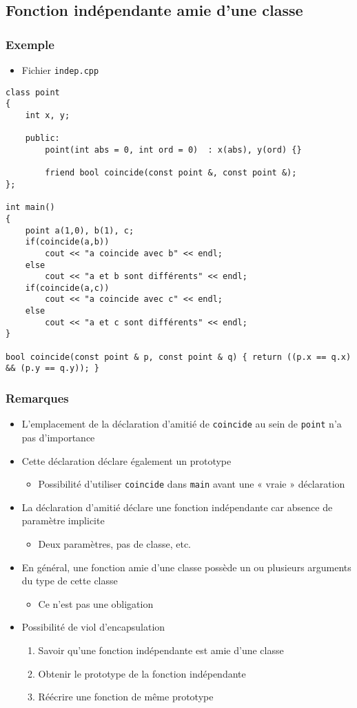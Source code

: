 \subsection{Fonction indépendante amie d'une classe}

\begin{frame}[containsverbatim]
\frametitle{Exemple}
\begin{itemize}
\item Fichier \texttt{indep.cpp}
\end{itemize}
\begin{lstlisting}
class point
{
	int x, y;
	
	public:
		point(int abs = 0, int ord = 0)  : x(abs), y(ord) {}
		
		friend bool coincide(const point &, const point &);
};

int main()
{
	point a(1,0), b(1), c;
	if(coincide(a,b))
		cout << "a coincide avec b" << endl;
	else
		cout << "a et b sont différents" << endl;		
	if(coincide(a,c))
		cout << "a coincide avec c" << endl;
	else
		cout << "a et c sont différents" << endl;
}

bool coincide(const point & p, const point & q) { return ((p.x == q.x) && (p.y == q.y)); }
\end{lstlisting}
\end{frame}

\begin{frame}
\frametitle{Remarques}
\begin{itemize}[<+->]
\item L'emplacement de la déclaration d'amitié de \texttt{coincide} au sein de \texttt{point} n'a pas d'importance
\item Cette déclaration déclare également un prototype
	\begin{itemize}
	\item Possibilité d'utiliser \texttt{coincide} dans \texttt{main} avant une « vraie » déclaration
	\end{itemize}
\item La déclaration d'amitié déclare une fonction indépendante car absence de paramètre implicite
	\begin{itemize}
	\item Deux paramètres, pas de classe, etc.
	\end{itemize}
\item En général, une fonction amie d'une classe possède un ou plusieurs arguments du type de cette classe
	\begin{itemize}
	\item Ce n'est pas une obligation
	\end{itemize}
\item Possibilité de viol d'encapsulation
	\begin{enumerate}
	\item Savoir qu'une fonction indépendante est amie d'une classe
	\item Obtenir le prototype de la fonction indépendante
	\item Réécrire une fonction de même prototype
	\end{enumerate}
\end{itemize}
\end{frame}

